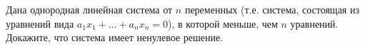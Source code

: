 Дана однородная линейная система от $n$ переменных (т.е. система, состоящая из уравнений вида
$a_1 x_1 + \dots + a_n x_n = 0$), в которой меньше, чем $n$ уравнений. Докажите, что система имеет
ненулевое решение.
